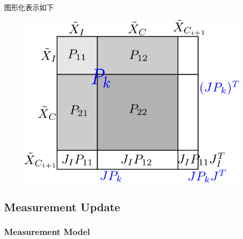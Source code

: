 \documentclass[12pt,a4paper]{article}
\begin{document}
图形化表示如下

\begin{figure}[!htbp]
\centering
\includegraphics[scale=0.8]{images/visual_conv_augmentation.png}
\end{figure}

\subsection{Measurement Update}

\subsubsection{Measurement Model}
\end{document}
